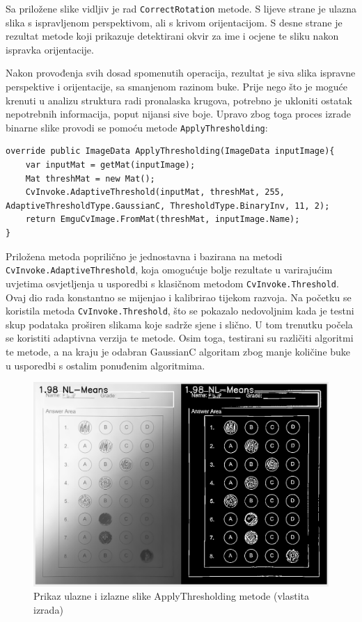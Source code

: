 \documentclass{foi}
\begin{document}
Sa priložene slike vidljiv je rad \texttt{CorrectRotation} metode. S lijeve strane je ulazna slika s ispravljenom perspektivom, ali s krivom orijentacijom. S desne strane je rezultat metode koji prikazuje detektirani okvir za ime i ocjene te sliku nakon ispravka orijentacije.

Nakon provođenja svih dosad spomenutih operacija, rezultat je siva slika ispravne perspektive i orijentacije, sa smanjenom razinom buke. Prije nego što je moguće krenuti u analizu struktura radi pronalaska krugova, potrebno je ukloniti ostatak nepotrebnih informacija, poput nijansi sive boje. Upravo zbog toga proces izrade binarne slike provodi se pomoću metode \texttt{ApplyThresholding}:

\begin{lstlisting}[caption={Metoda za pretvorbu sive slike u binarnu sliku}]
override public ImageData ApplyThresholding(ImageData inputImage){
    var inputMat = getMat(inputImage);
    Mat threshMat = new Mat();
    CvInvoke.AdaptiveThreshold(inputMat, threshMat, 255, AdaptiveThresholdType.GaussianC, ThresholdType.BinaryInv, 11, 2);
    return EmguCvImage.FromMat(threshMat, inputImage.Name);
}
\end{lstlisting}

Priložena metoda poprilično je jednostavna i bazirana na metodi \texttt{CvInvoke.AdaptiveThreshold}, koja omogućuje bolje rezultate u varirajućim uvjetima osvjetljenja u usporedbi s klasičnom metodom \texttt{CvInvoke.Threshold}. Ovaj dio rada konstantno se mijenjao i kalibrirao tijekom razvoja. Na početku se koristila metoda \texttt{CvInvoke.Threshold}, što se pokazalo nedovoljnim kada je testni skup podataka proširen slikama koje sadrže sjene i slično. U tom trenutku počela se koristiti adaptivna verzija te metode. Osim toga, testirani su različiti algoritmi te metode, a na kraju je odabran GaussianC algoritam zbog manje količine buke u usporedbi s ostalim ponuđenim algoritmima.

\begin{figure}[H]
\centering
\includegraphics[width=0.7\linewidth]{slike/TresholdingComparison.png}
\caption{Prikaz ulazne i izlazne slike ApplyThresholding metode (vlastita izrada)}
\end{figure}
\end{document}
